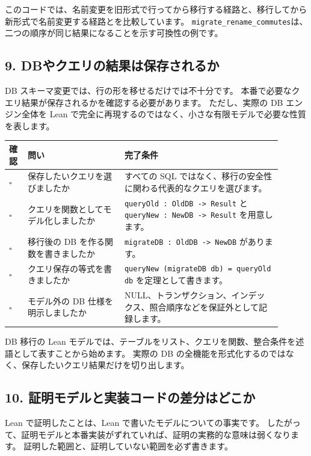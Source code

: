 このコードでは、名前変更を旧形式で行ってから移行する経路と、移行してから新形式で名前変更する経路とを比較しています。
\texttt{migrate\_rename\_commutes}は、二つの順序が同じ結果になることを示す可換性の例です。

\subsection{9. DBやクエリの結果は保存されるか}

DB スキーマ変更では、行の形を移せるだけでは不十分です。
本番で必要なクエリ結果が保存されるかを確認する必要があります。
ただし、実際の DB エンジン全体を Lean で完全に再現するのではなく、小さな有限モデルで必要な性質を表します。

\begin{longtable}{@{}p{0.06\linewidth}p{0.32\linewidth}p{0.52\linewidth}@{}}
\toprule
確認 & 問い & 完了条件 \\
\midrule
\endhead
\(\square\) & 保存したいクエリを選びましたか & すべての SQL ではなく、移行の安全性に関わる代表的なクエリを選びます。 \\
\(\square\) & クエリを関数としてモデル化しましたか & \texttt{queryOld : OldDB -> Result} と \texttt{queryNew : NewDB -> Result} を用意します。 \\
\(\square\) & 移行後の DB を作る関数を書きましたか & \texttt{migrateDB : OldDB -> NewDB} があります。 \\
\(\square\) & クエリ保存の等式を書きましたか & \texttt{queryNew (migrateDB db) = queryOld db} を定理として書きます。 \\
\(\square\) & モデル外の DB 仕様を明示しましたか & NULL、トランザクション、インデックス、照合順序などを保証外として記録します。 \\
\bottomrule
\end{longtable}

DB 移行の Lean モデルでは、テーブルをリスト、クエリを関数、整合条件を述語として表すことから始めます。
実際の DB の全機能を形式化するのではなく、保存したいクエリ結果だけを切り出します。

\subsection{10. 証明モデルと実装コードの差分はどこか}

Lean で証明したことは、Lean で書いたモデルについての事実です。
したがって、証明モデルと本番実装がずれていれば、証明の実務的な意味は弱くなります。
証明した範囲と、証明していない範囲を必ず書きます。

